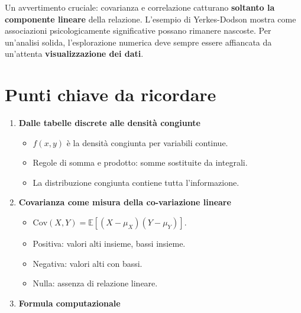 \documentclass[
  italian,
  letterpaper,
  a4paper,
  11pt,
  open=any]{scrbook}
\providecommand{\tightlist}{%
  \setlength{\itemsep}{0pt}\setlength{\parskip}{0pt}}
\theoremstyle{plain}
\theoremstyle{definition}
\theoremstyle{definition}
\theoremstyle{remark}
\begin{document}
Un avvertimento cruciale: covarianza e correlazione catturano
\textbf{soltanto la componente lineare} della relazione. L'esempio di
Yerkes-Dodson mostra come associazioni psicologicamente significative
possano rimanere nascoste. Per un'analisi solida, l'esplorazione
numerica deve sempre essere affiancata da un'attenta
\textbf{visualizzazione dei dati}.

\section*{Punti chiave da ricordare}\label{punti-chiave-da-ricordare-8}


\begin{tcolorbox}[enhanced jigsaw, arc=.35mm, bottomrule=.15mm, bottomtitle=1mm, breakable, colback=white, colbacktitle=quarto-callout-important-color!10!white, colframe=quarto-callout-important-color-frame, coltitle=black, left=2mm, leftrule=.75mm, opacityback=0, opacitybacktitle=0.6, rightrule=.15mm, title=\textcolor{quarto-callout-important-color}{\faExclamation}\hspace{0.5em}{Importante}, titlerule=0mm, toprule=.15mm, toptitle=1mm]

\begin{enumerate}
\def\labelenumi{\arabic{enumi}.}
\tightlist
\item
  \textbf{Dalle tabelle discrete alle densità congiunte}

  \begin{itemize}
  \tightlist
  \item
    \(f(x,y)\) è la densità congiunta per variabili continue.
  \item
    Regole di somma e prodotto: somme sostituite da integrali.
  \item
    La distribuzione congiunta contiene tutta l'informazione.
  \end{itemize}
\item
  \textbf{Covarianza come misura della co-variazione lineare}

  \begin{itemize}
  \tightlist
  \item
    \(\text{Cov}(X,Y) = \mathbb{E}[(X-\mu_X)(Y-\mu_Y)]\).
  \item
    Positiva: valori alti insieme, bassi insieme.
  \item
    Negativa: valori alti con bassi.
  \item
    Nulla: assenza di relazione lineare.
  \end{itemize}
\item
  \textbf{Formula computazionale}


\end{enumerate}
\end{tcolorbox}
\end{document}
